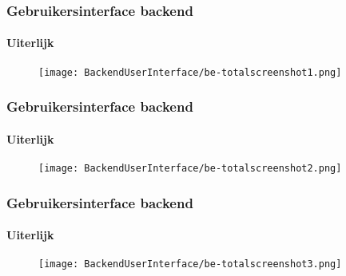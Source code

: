 
\begin{frame}[fragile]
	\frametitle{Gebruikersinterface backend}
	\framesubtitle{Uiterlijk}

	\begin{figure}
		\texttt{[image: BackendUserInterface/be-totalscreenshot1.png]}
	\end{figure}

\end{frame}


\begin{frame}[fragile]
	\frametitle{Gebruikersinterface backend}
	\framesubtitle{Uiterlijk}

	\begin{figure}
		\texttt{[image: BackendUserInterface/be-totalscreenshot2.png]}
	\end{figure}

\end{frame}


\begin{frame}[fragile]
	\frametitle{Gebruikersinterface backend}
	\framesubtitle{Uiterlijk}

	\begin{figure}
		\texttt{[image: BackendUserInterface/be-totalscreenshot3.png]}
	\end{figure}

\end{frame}

